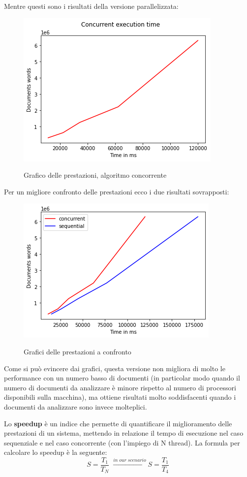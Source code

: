 \noindent Mentre questi sono i risultati della versione parallelizzata:
\begin{figure}[H]
	\begin{center}
		\includegraphics[width=0.55\linewidth]{img/concurrent-graph.png}
		\label{fig:conc}
		\caption{Grafico delle prestazioni, algoritmo concorrente}
	\end{center}
\end{figure}

\noindent Per un migliore confronto delle prestazioni ecco i due risultati sovrapposti:

\begin{figure}[H]
	\begin{center}
		\includegraphics[width=0.55\linewidth]{img/concurrent-vs-sequential-graph.png}
		\label{fig:seqconc}
		\caption{Grafici delle prestazioni a confronto}
	\end{center}
\end{figure}

\noindent Come si può evincere dai grafici, questa versione non migliora di molto le performance con un numero basso di documenti (in particolar modo quando il numero di documenti da analizzare è minore rispetto al numero di processori disponibili sulla macchina), ma ottiene risultati molto soddisfacenti quando i documenti da analizzare sono invece molteplici.\newline

\noindent Lo \textbf{speedup} è un indice che permette di quantificare il miglioramento delle prestazioni di un sistema, mettendo in relazione il tempo di esecuzione nel caso sequenziale e nel caso concorrente (con l'impiego di N thread).\newline
La formula per calcolare lo speedup è la seguente:
$$ S = \frac{T_1}{T_N} \; \xrightarrow{in\;our\;scenario} S = \frac{T_1}{T_4}$$



